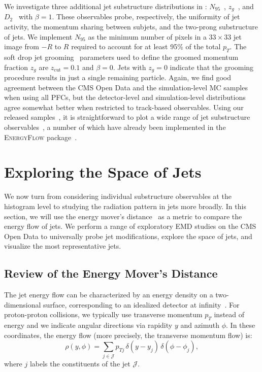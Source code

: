 \documentclass[aps,prd,twocolumn,preprintnumbers,nofootinbib,longbibliography,floatfix,superscriptaddress]{revtex4-1}
\begin{document}
We investigate three additional jet substructure distributions in : $N_{95}$~\cite{Pumplin:1991kc}, $z_g$~\cite{Larkoski:2015lea}, and $D_2$~\cite{Larkoski:2014gra} with $\beta=1$.
%
These observables probe, respectively, the uniformity of jet activity, the momentum sharing between subjets, and the two-prong substructure of jets.
%
We implement $N_{95}$ as the minimum number of pixels in a $33\times33$ jet image from $-R$ to $R$ required to account for at least 95\% of the total $p_T$.
%
The soft drop jet grooming~\cite{Dasgupta:2013ihk,Larkoski:2014wba} parameters used to define the groomed momentum fraction $z_g$ are $z_\text{cut}=0.1$ and $\beta=0$.
%
Jets with $z_g=0$ indicate that the grooming procedure results in just a single remaining particle.
%
Again, we find good agreement between the CMS Open Data and the simulation-level MC samples when using all PFCs, but the detector-level and simulation-level distributions agree somewhat better when restricted to track-based observables.
%
Using our released samples~\cite{MOD:ZenodoCMS,MOD:ZenodoMC170,MOD:ZenodoMC300,MOD:ZenodoMC470,MOD:ZenodoMC600,MOD:ZenodoMC800,MOD:ZenodoMC1000,MOD:ZenodoMC1400,MOD:ZenodoMC1800}, it is straightforward to plot a wide range of jet substructure observables~\cite{MODDemo}, a number of which have already been implemented in the \textsc{EnergyFlow} package~\cite{EnergyFlow}.



\section{Exploring the Space of Jets}
\label{sec:emd}


We now turn from considering individual substructure observables at the histogram level to studying the radiation pattern in jets more broadly.
%
In this section, we will use the energy mover's distance~\cite{Komiske:2019fks} as a metric to compare the energy flow of jets.
%
We perform a range of exploratory EMD studies on the CMS Open Data to universally probe jet modifications, explore the space of jets, and visualize the most representative jets.


\subsection{Review of the Energy Mover's Distance}
\label{subsec:emd_review}


The jet energy flow can be characterized by an energy density on a two-dimensional surface, corresponding to an idealized detector at infinity~\cite{Tkachov:1995kk,Sveshnikov:1995vi,Cherzor:1997ak}.
%
For proton-proton collisions, we typically use transverse momentum $p_{T}$ instead of energy and we indicate angular directions via rapidity $y$ and azimuth $\phi$.
%
In these coordinates, the energy flow (more precisely, the transverse momentum flow) is:
\begin{equation}
\label{eq:energyflow}
\rho(y,\phi) = \sum_{j \in \mathcal{J}} p_{Tj} \, \delta(y - y_j) \, \delta(\phi - \phi_j),
\end{equation}
where $j$ labels the constituents of the jet $\mathcal{J}$.
\end{document}
